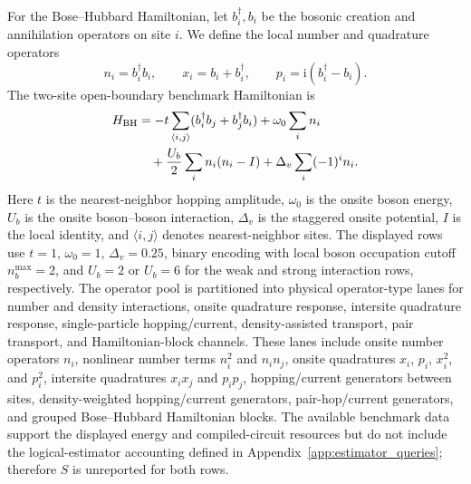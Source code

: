 \documentclass[
  reprint,
  amsmath,
  amssymb,
  aps,
  pra,
  nofootinbib,
  superscriptaddress,
  floatfix
]{revtex4-2}
\newcommand{\ii}{\mathrm{i}}
\begin{document}
For the Bose--Hubbard Hamiltonian, let \(b_i^\dagger,b_i\) be the bosonic
creation and annihilation operators on site \(i\). We define the local number
and quadrature operators
\[
n_i=b_i^\dagger b_i,\qquad
x_i=b_i+b_i^\dagger,\qquad
p_i=\ii(b_i^\dagger-b_i).
\]
The two-site open-boundary benchmark Hamiltonian is
\begin{equation*}
\begin{aligned}
H_{\rm BH}
&=-t\sum_{\langle i,j\rangle}
(b_i^\dagger b_j+b_j^\dagger b_i)
+\omega_0\sum_i n_i\\
&\quad+\frac{U_b}{2}\sum_i n_i(n_i-I)
+\Delta_v\sum_i(-1)^i n_i .
\end{aligned}
\end{equation*}
Here \(t\) is the nearest-neighbor hopping amplitude, \(\omega_0\) is the
onsite boson energy, \(U_b\) is the onsite boson--boson interaction,
\(\Delta_v\) is the staggered onsite potential, \(I\) is the local identity,
and \(\langle i,j\rangle\) denotes nearest-neighbor sites. The displayed rows
use \(t=1\), \(\omega_0=1\), \(\Delta_v=0.25\), binary encoding with local
boson occupation cutoff \(n_b^{\max}=2\), and \(U_b=2\) or \(U_b=6\) for the
weak and strong interaction rows, respectively.
The operator pool is partitioned into physical operator-type lanes for number
and density interactions, onsite quadrature response, intersite quadrature
response, single-particle hopping/current, density-assisted transport, pair
transport, and Hamiltonian-block channels. These lanes include onsite number
operators \(n_i\), nonlinear number terms \(n_i^2\) and \(n_in_j\), onsite
quadratures \(x_i\), \(p_i\), \(x_i^2\), and \(p_i^2\), intersite quadratures
\(x_ix_j\) and \(p_ip_j\), hopping/current generators between sites,
density-weighted hopping/current generators, pair-hop/current generators, and
grouped Bose--Hubbard Hamiltonian blocks.
The available benchmark data support the displayed energy and compiled-circuit
resources but do not include the logical-estimator accounting defined in
Appendix~\ref{app:estimator_queries}; therefore \(S\) is
unreported for both rows.
\end{document}
